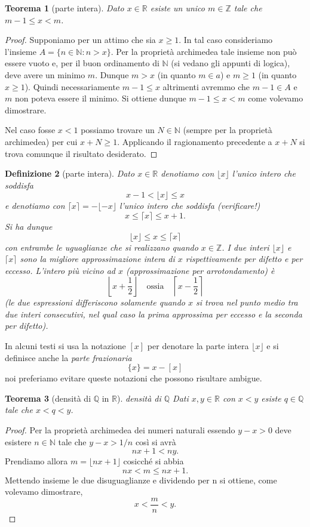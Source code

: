 \documentclass[italian,a4paper,oneside,headinclude]{scrbook}
\newcommand{\NN}{\mathbb N}
\newcommand{\QQ}{\mathbb Q}
\newcommand{\RR}{\mathbb R}
\newcommand{\ZZ}{\mathbb Z}
\newtheorem{theorem}{Teorema}
\newtheorem{definition}[theorem]{Definizione}
\begin{document}
\begin{theorem}[parte intera]
Dato $x\in \RR$ esiste un unico $m\in \ZZ$ tale che $m-1 \le x < m$.
\end{theorem}
%
\begin{proof}
Supponiamo per un attimo che sia $x\ge 1$.
In tal caso consideriamo l'insieme $A=\{n\in \NN\colon n > x\}$.
Per la proprietà archimedea tale insieme non può essere vuoto e,
per il buon ordinamento di $\NN$ (si vedano gli appunti di logica),
deve avere un minimo $m$.
Dunque $m>x$ (in quanto $m\in a$) e $m\ge 1$ (in quanto $x\ge 1$).
Quindi necessariamente $m-1 \le x$ altrimenti avremmo che $m-1\in A$ e $m$
non poteva essere il minimo. Si ottiene dunque $m-1\le x < m$ come volevamo
dimostrare.

Nel caso fosse $x<1$ possiamo trovare un $N\in \NN$ (sempre per la proprietà archimedea) per cui $x+N \ge 1$. Applicando il ragionamento precedente a $x+N$ si trova comunque il risultato desiderato.
\end{proof}

\begin{definition}[parte intera]
Dato $x\in \RR$ denotiamo con $\lfloor x\rfloor$ l'unico intero
che soddisfa
\marginpar{$\lfloor \cdot \rfloor$}
\[
  x - 1 < \lfloor x \rfloor \le x
\]
e denotiamo con $\lceil x \rceil = - \lfloor -x \rfloor$ l'unico intero che soddisfa (verificare!)
\marginpar{$\lceil \cdot \rceil$}
\[
  x \le \lceil x \rceil \le x + 1.
\]
Si ha dunque
\[
  \lfloor x \rfloor \le x \le \lceil x \rceil
\]
con entrambe le uguaglianze che si realizzano quando $x\in \ZZ$.
I due interi $\lfloor x \rfloor$ e $\lceil x \rceil$
sono la migliore approssimazione intera di $x$ rispettivamente
per difetto e per eccesso.
L'intero più vicino ad $x$ (approssimazione per arrotondamento)
è
\[
  \left\lfloor x + \frac 1 2 \right\rfloor
\quad \text{ossia} \quad
  \left\lceil x-\frac 1 2 \right\rceil
\]
(le due espressioni differiscono solamente quando $x$ si trova nel punto medio tra due interi consecutivi, nel qual caso la prima approssima per eccesso e la seconda per difetto).
\end{definition}
In alcuni testi si usa la notazione $[x]$ per denotare la parte intera $\lfloor x \rfloor$ e si definisce
anche la \emph{parte frazionaria}
\[
   \{x\} = x - [x]
\]
noi preferiamo evitare queste notazioni che possono risultare ambigue.

\begin{theorem}[densità di $\QQ$ in $\RR$]
\emph{densità di $\QQ$}
Dati $x,y \in \RR$ con $x<y$ esiste $q\in \QQ$ tale che $x<q<y$.
\end{theorem}
%
\begin{proof}
Per la proprietà archimedea dei numeri naturali essendo $y-x>0$
deve esistere $n\in \NN$ tale che $y-x > 1/n$ così si avrà
\[
    nx + 1 < ny.
\]
Prendiamo allora $m=\lfloor nx + 1\rfloor$ cosicché si abbia
\[
  nx < m \le nx + 1.
\]
Mettendo insieme le due disuguaglianze e dividendo per n si ottiene,
come volevamo dimostrare,
\[
 x < \frac{m}{n} < y.
\]
\end{proof}
\end{document}

